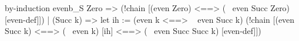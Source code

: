 %
%
\begin{tcAthena}
  by-induction evenb_S {
    Zero => (!chain [(even Zero)
                <==> (~ even Succ Zero)                   [even-def]])
  | (Succ k) => let {ih := (even k <==> ~ even Succ k)}
                  (!chain [(even Succ k)
                      <==> (~ even k)                     [ih]
                      <==> (~ even Succ Succ k)           [even-def]])
  }
\end{tcAthena}
